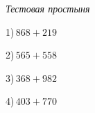 \documentclass{article}
\begin{document}
 
\begin{center} 
   \large{\textit{Тестовая простыня}} 
\end{center}\begin{multicols}{2}
1)$\,868+219$ \par 
2)$\,565+558$ \par 
3)$\,368+982$ \par 
4)$\,403+770$ \par 
\end{multicols} 
\end{document}
